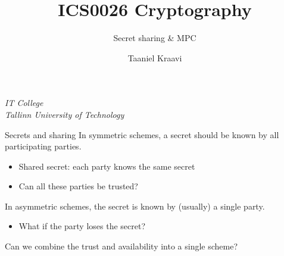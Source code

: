 

\usepackage[dvipsnames]{xcolor}

\usepackage{booktabs}

\usepackage{fancyvrb}

\usepackage{csquotes}

\usepackage{graphicx}
\graphicspath{ {../../images/} }

\usepackage{pgfplots}
\usetikzlibrary{positioning,calc,external}

\usepackage{crysymb}

\renewcommand*{\arraystretch}{1.2}

\usepackage{soul}
\usepackage[en-GB]{datetime2}

\usetikzlibrary{positioning,calc}
\graphicspath{ {../../images/} }

\title{ICS0026 Cryptography}
\subtitle{Secret sharing \& MPC}
\date{}
\author{Taaniel Kraavi}
\institute%
{%
  \textit{IT College}\\
  \textit{Tallinn University of Technology}
}


\begin{frame}
  \titlepage
\end{frame}

\begin{frame}{Secrets and sharing}
  In symmetric schemes, a secret should be known by all participating parties.
  \begin{itemize}[<+(1)->]
    \item Shared secret: each party knows the same secret
    \item Can all these parties be trusted?
  \end{itemize}

  \vspace*{1em}

  \pause
  In asymmetric schemes, the secret is known by (usually) a single party.
  \begin{itemize}[<+(1)->]
    \item What if the party loses the secret?
  \end{itemize}

  \vspace*{1em}

  \pause
  Can we combine the trust and availability into a single scheme?
\end{frame}

